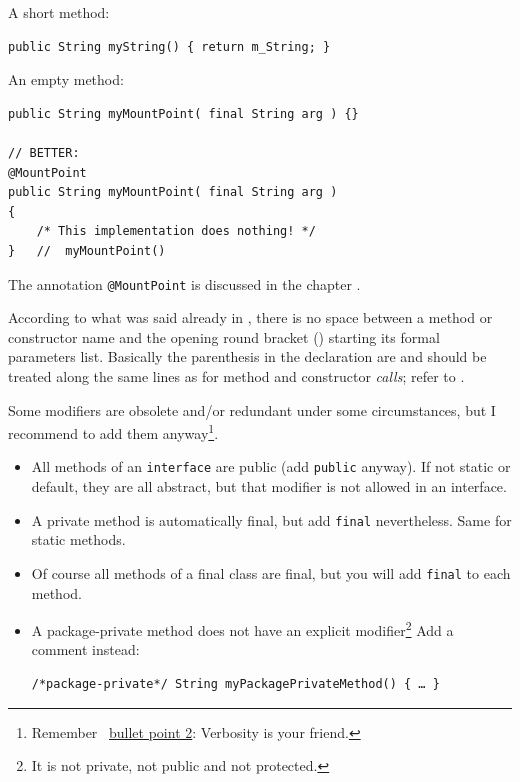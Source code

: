 A short method:
\begin{lstlisting}
public String myString() { return m_String; }
\end{lstlisting}

An empty method:
\begin{lstlisting}
public String myMountPoint( final String arg ) {}

// BETTER:
@MountPoint
public String myMountPoint( final String arg ) 
{
    /* This implementation does nothing! */
}   //  myMountPoint()
\end{lstlisting}
The annotation \lstinline|@MountPoint| \autocite{TQUADRAT_ORG_FOUNDATION_MOUNTPOINT} is discussed in the chapter .

According to what was said already in , there is no space between a method or constructor name and the opening round bracket (\bdq{(}) starting its formal parameters list. Basically the parenthesis in the declaration are  and should be treated along the same lines as for method and constructor \textit{calls}; refer to .

Some modifiers are obsolete and/or redundant under some circumstances, but I recommend to add them anyway\footnote{Remember \ngref ~\hyperref[lst:ZoP:ExplicitVsImplicit]{bullet point 2}: Verbosity is your friend.}.

\begin{itemize}
\item{All methods of an \lstinline|interface| are public (add \lstinline|public| anyway). If not static or default, they are all abstract, but that modifier is not allowed in an interface.}
\item{A private method is automatically final, but add \lstinline|final| nevertheless. Same for static methods.}
\item{Of course all methods of a final class are final, but you will add \lstinline|final| to each method.}
\item{A package-private method does not have an explicit modifier\footnote{It is not private, not public and not protected.} Add a comment instead:
\begin{lstlisting}
/*package-private*/ String myPackagePrivateMethod() { … }
\end{lstlisting}}
\end{itemize}

